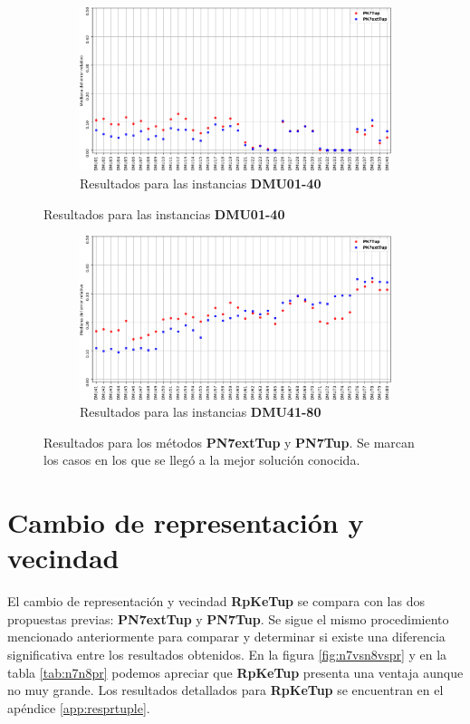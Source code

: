 \begin{figure}[hbtp]
    \begin{subfigure}{\textwidth}
        \centering
        \includegraphics[scale=.6]{Imagenes/n8vsn7err1.png}
        \caption{Resultados para las instancias \textbf{DMU01-40}}
    \end{subfigure}
\end{figure}
\begin{figure}[H]\ContinuedFloat
    \begin{subfigure}{\textwidth}
        \centering
        \includegraphics[scale=.6]{Imagenes/n8vsn7err2.png}
        \caption{Resultados para las instancias \textbf{DMU41-80}}
    \end{subfigure}
    \caption{Resultados para los métodos \textbf{PN7extTup} y \textbf{PN7Tup}. Se marcan los casos en los que se llegó a la mejor solución conocida.}
    \label{fig:errn8vsn7}
\end{figure}

\section{Cambio de representación y vecindad}
El cambio de representación y vecindad \textbf{RpKeTup} se compara con las dos propuestas previas: \textbf{PN7extTup} y \textbf{PN7Tup}. Se sigue el mismo procedimiento mencionado anteriormente para comparar y determinar si existe una diferencia significativa entre los resultados obtenidos. En la figura \ref{fig:n7vsn8vspr} y en la tabla \ref{tab:n7n8pr} podemos apreciar que \textbf{RpKeTup} presenta una ventaja aunque no muy grande. Los resultados detallados para \textbf{RpKeTup} se encuentran en el apéndice \ref{app:resprtuple}. 

